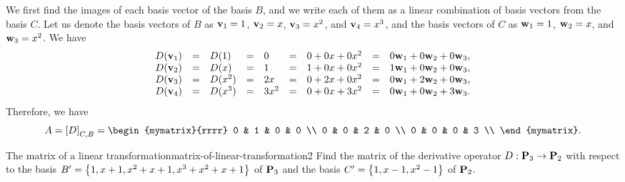 \begin{solution}
  We first find the images of each basis vector of the basis $B$, and
  we write each of them as a linear combination of basis vectors from
  the basis $C$. Let us denote the basis vectors of $B$ as
  $\mbox{\bf v}_1 = 1$, $\mbox{\bf v}_2 = x$, $\mbox{\bf v}_3 = x^2$, and
  $\mbox{\bf v}_4=x^3$, and the basis vectors of $C$ as $\mbox{\bf w}_1 = 1$,
  $\mbox{\bf w}_2 = x$, and $\mbox{\bf w}_3 = x^2$. We have
  \begin{equation*}
    \begin{array}{rclclclcl}
      D(\mbox{\bf v}_1) &=& D(1) &=& 0 &=& 0 + 0x + 0x^2 &=& 0\mbox{\bf w}_1 + 0\mbox{\bf w}_2 + 0\mbox{\bf w}_3, \\
      D(\mbox{\bf v}_2) &=& D(x) &=& 1 &=& 1 + 0x + 0x^2 &=& 1\mbox{\bf w}_1 + 0\mbox{\bf w}_2 + 0\mbox{\bf w}_3, \\
      D(\mbox{\bf v}_3) &=& D(x^2) &=& 2x &=& 0 + 2x + 0x^2 &=& 0\mbox{\bf w}_1 + 2\mbox{\bf w}_2 + 0\mbox{\bf w}_3, \\
      D(\mbox{\bf v}_4) &=& D(x^3) &=& 3x^2 &=& 0 + 0x + 3x^2 &=& 0\mbox{\bf w}_1 + 0\mbox{\bf w}_2 + 3\mbox{\bf w}_3. \\
    \end{array}
  \end{equation*}
  Therefore, we have
  \begin{equation*}
    A=\coord{D}_{C,B} =
    \begin{mymatrix}{rrrr}
      0 & 1 & 0 & 0 \\
      0 & 0 & 2 & 0 \\
      0 & 0 & 0 & 3 \\
    \end{mymatrix}.
  \end{equation*}
\end{solution}

\begin{example}{The matrix of a linear transformation}{matrix-of-linear-transformation2}
  Find the matrix of the derivative operator $D:\mathbf{P}_3\to\mathbf{P}_2$
  with respect to the basis $B'=\left\{1,x+1,x^2+x+1,x^3+x^2+x+1\right\}$ of
  $\mathbf{P}_3$ and the basis $C'=\left\{1,x-1,x^2-1\right\}$ of $\mathbf{P}_2$.
\end{example}

